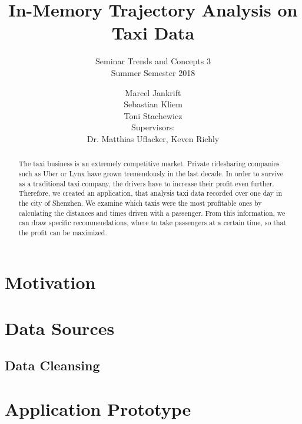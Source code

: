 \documentclass{sig-alternate}
\begin{document}

\title{
  \vspace{24pt}
  In-Memory Trajectory Analysis on Taxi Data
}
\subtitle{
  Seminar Trends and Concepts 3\\
  Summer Semester 2018
}


\author{
  Marcel Jankrift\\
  Sebastian Kliem\\
  Toni Stachewicz\\[12pt]
  Supervisors:\\
  Dr. Matthias Uflacker, Keven Richly
}

\maketitle
\begin{abstract}
The taxi business is an extremely competitive market. Private ridesharing companies such as Uber or Lynx have grown tremendously in the last decade. In order to survive as a traditional taxi company, the drivers have to increase their profit even further. Therefore, we created an application, that analysis taxi data recorded over one day in the city of Shenzhen. We examine which taxis were the most profitable ones by calculating the distances and times driven with a passenger. From this information, we can draw specific recommendations, where to take passengers at a certain time, so that the profit can be maximized.
\end{abstract}



\section{Motivation}

\section{Data Sources}

\subsection{Data Cleansing}

\section{Application Prototype}
\end{document}
